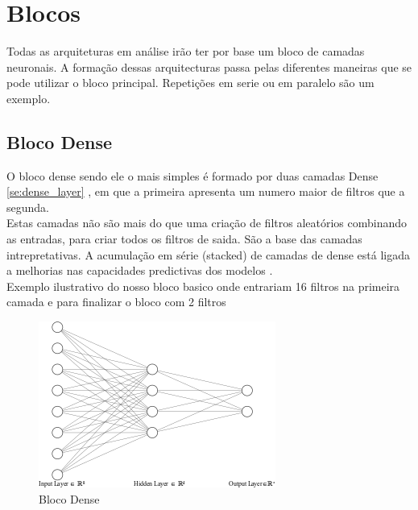 \section{Blocos\label{se:blocos}}

Todas as arquiteturas em análise irão ter por base um bloco de camadas neuronais. A formação dessas arquitecturas passa pelas diferentes maneiras que se pode utilizar o bloco principal. Repetições em serie ou em paralelo são um exemplo. \\

\subsection{Bloco Dense\label{se:dense}}

O bloco dense sendo ele o mais simples é formado por duas camadas Dense \ref{se:dense_layer} \cite{}, em que a primeira apresenta um numero maior de filtros que a segunda. \\
Estas camadas não são mais do que uma criação de filtros aleatórios combinando as entradas, para criar todos os filtros de saida. São a base das camadas intrepretativas. A acumulação em série (stacked) de camadas de dense está ligada a melhorias nas capacidades predictivas dos modelos \cite{VLHelen2021}. \\
Exemplo ilustrativo do nosso bloco basico onde entrariam 16 filtros na primeira camada e para finalizar o bloco com 2 filtros \\

\begin{figure}[H]
	\centering
	\includegraphics{Imagens/dense_layer.png}
	\caption{Bloco Dense}
	\label{fig:dense_blcok}
\end{figure}

